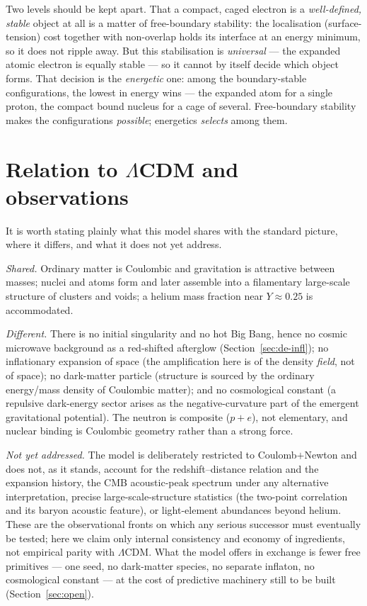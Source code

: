 \documentclass[11pt]{article}
\begin{document}
Two levels should be kept apart. That a compact, caged electron is a \emph{well-defined, stable} object at all is
a matter of free-boundary stability: the localisation (surface-tension) cost together with non-overlap holds its
interface at an energy minimum, so it does not ripple away. But this stabilisation is \emph{universal} --- the
expanded atomic electron is equally stable --- so it cannot by itself decide which object forms. That decision is
the \emph{energetic} one: among the boundary-stable configurations, the lowest in energy wins --- the expanded
atom for a single proton, the compact bound nucleus for a cage of several. Free-boundary stability makes the
configurations \emph{possible}; energetics \emph{selects} among them.

\section{Relation to $\Lambda$CDM and observations}\label{sec:lcdm}
It is worth stating plainly what this model shares with the standard picture, where it differs, and what it does
not yet address.

\emph{Shared.} Ordinary matter is Coulombic and gravitation is attractive between masses; nuclei and atoms form and
later assemble into a filamentary large-scale structure of clusters and voids; a helium mass fraction near
$Y\approx0.25$ is accommodated.

\emph{Different.} There is no initial singularity and no hot Big Bang, hence no cosmic microwave background as a
red-shifted afterglow (Section~\ref{sec:de-infl}); no inflationary expansion of space (the amplification here is of
the density \emph{field}, not of space); no dark-matter particle (structure is sourced by the ordinary
energy/mass density of Coulombic matter); and no cosmological constant (a repulsive dark-energy sector arises as
the negative-curvature part of the emergent gravitational potential). The neutron is composite ($p+e$), not
elementary, and nuclear binding is Coulombic geometry rather than a strong force.

\emph{Not yet addressed.} The model is deliberately restricted to Coulomb$+$Newton and does not, as it stands,
account for the redshift--distance relation and the expansion history, the CMB acoustic-peak spectrum under any
alternative interpretation, precise large-scale-structure statistics (the two-point correlation and its baryon
acoustic feature), or light-element abundances beyond helium. These are the observational fronts on which any
serious successor must eventually be tested; here we claim only internal consistency and economy of ingredients,
not empirical parity with $\Lambda$CDM. What the model offers in exchange is fewer free primitives --- one seed, no
dark-matter species, no separate inflaton, no cosmological constant --- at the cost of predictive machinery still
to be built (Section~\ref{sec:open}).
\end{document}
